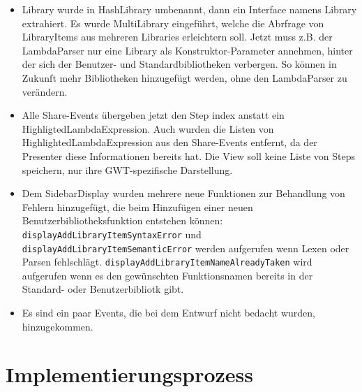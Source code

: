 \documentclass[parskip=full,11pt,twoside]{scrartcl}
\begin{document}
\begin{itemize}
    \item Library wurde in HashLibrary umbenannt, dann ein Interface namens Library extrahiert.
Es wurde MultiLibrary eingeführt, welche die Abrfrage von LibraryItems aus mehreren Libraries erleichtern soll.
Jetzt muss z.B. der LambdaParser nur eine Library als Konstruktor-Parameter annehmen, hinter der sich der Benutzer- und Standardbibliotheken verbergen.
So können in Zukunft mehr Bibliotheken hinzugefügt werden, ohne den LambdaParser zu verändern.
    \newline

    \item Alle Share-Events übergeben jetzt den Step index anstatt ein HighligtedLambdaExpression.
    Auch wurden die Listen von HighlightedLambdaExpression aus den Share-Events entfernt,
    da der Presenter diese Informationen bereits hat.
    Die View soll keine Liste von Steps speichern, nur ihre GWT-spezifische Darstellung.

    \item Dem SidebarDisplay wurden mehrere neue Funktionen zur Behandlung von Fehlern hinzugefügt, die beim Hinzufügen einer neuen Benutzerbibliotheksfunktion entstehen können:
    	\texttt{displayAddLibraryItemSyntaxError} und \newline
        \texttt{displayAddLibraryItemSemanticError} werden aufgerufen wenn Lexen oder Parsen fehlschlägt.
        \texttt{displayAddLibraryItemNameAlreadyTaken} wird aufgerufen wenn es den gewünschten Funktionsnamen bereits in der Standard- oder Benutzerbibliotk gibt.

    \item Es sind ein paar Events, die bei dem Entwurf nicht bedacht wurden, 	hinzugekommen.
\end{itemize}



\section{Implementierungsprozess}
\end{document}
